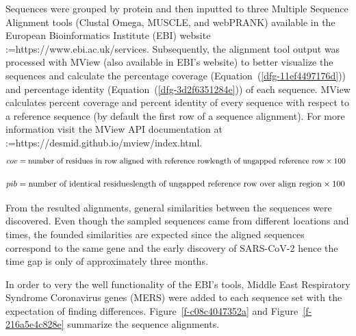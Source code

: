 \documentclass[11pt]{article}
\makeatletter
\def\BreakURLText#1{\@tfor\brk@tempa:=#1\do{\brk@tempa\hskip0pt}}
\makeatother
\begin{document}
Sequences were grouped by protein and then inputted to three Multiple Sequence Alignment tools (Clustal Omega, MUSCLE, and webPRANK) available in the European Bioinformatics Institute (EBI) website \BreakURLText{https://www.ebi.ac.uk/services.} Subsequently, the alignment tool output was processed with MView (also available in EBI's website) to better visualize the sequences and calculate the percentage coverage (Equation~(\ref{dfg-11ef4497176d})) and percentage identity (Equation~(\ref{dfg-3d2f6351284e})) of each sequence. MView calculates percent coverage and percent identity of every sequence with respect to a reference sequence (by default the first row of a sequence alignment). For more information visit the MView API documentation at \BreakURLText{https://desmid.github.io/mview/index.html.}
\let\saveeqnno\theequation
\let\savefrac\frac
\def\dispfrac{\displaystyle\savefrac}
\begin{eqnarray}
\let\frac\dispfrac
\gdef\theequation{1}
\let\theHequation\theequation
\label{dfg-11ef4497176d}
\begin{array}{@{}l}cov = \frac{\text{number of residues in row aligned with reference row}}{\text{length of ungapped reference row}} \times 100\end{array}
\end{eqnarray}
\global\let\theequation\saveeqnno
\addtocounter{equation}{-1}\ignorespaces 
{}\baselineskip 
\let\saveeqnno\theequation
\let\savefrac\frac
\def\dispfrac{\displaystyle\savefrac}
\begin{eqnarray}
\let\frac\dispfrac
\gdef\theequation{2}
\let\theHequation\theequation
\label{dfg-3d2f6351284e}
\begin{array}{@{}l}pib = \frac{\text{number of identical residues}}{\text{length of ungapped reference row over align region}} \times 100\end{array}
\end{eqnarray}
\global\let\theequation\saveeqnno
\addtocounter{equation}{-1}\ignorespaces 
From the resulted alignments, general similarities between the sequences were discovered. Even though the sampled sequences came from different locations and times, the founded similarities are expected since the aligned sequences correspond to the same gene and the early discovery of SARS-CoV-2 hence the time gap is only of approximately three months.

In order to very the well functionality of the EBI's tools, Middle East Respiratory Syndrome Coronavirus genes (MERS) were added to each sequence set with the expectation of finding differences. Figure~\ref{f-c08c4047352a} and Figure~\ref{f-216a5e4c828e} summarize the sequence alignments.
\end{document}
